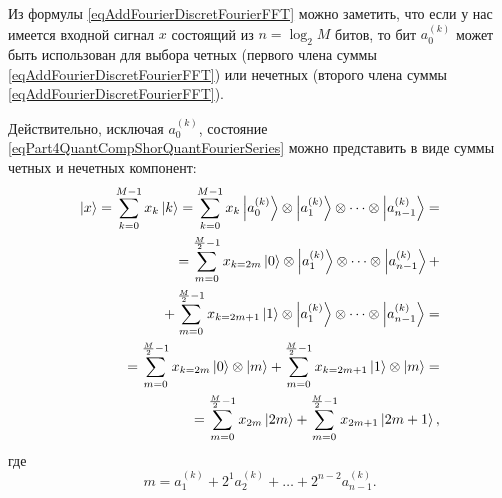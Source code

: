 Из формулы \eqref{eqAddFourierDiscretFourierFFT} можно
заметить, что если у нас имеется входной сигнал $x$ состоящий из $n =
\log_2{M}$ 
битов, то бит $a^{(k)}_0$ может быть использован для выбора четных
(первого члена суммы \eqref{eqAddFourierDiscretFourierFFT})
или нечетных 
(второго члена суммы \eqref{eqAddFourierDiscretFourierFFT}).

Действительно, исключая $a^{(k)}_0$, состояние
\eqref{eqPart4QuantCompShorQuantFourierSeries} можно представить в
виде суммы четных и нечетных компонент: 
\begin{eqnarray}
\ket{x} = \sum_{k = 0}^{M - 1}x_k \ket{k} = 
\sum_{k = 0}^{M - 1}x_k \ket{a^{(k)}_0} \otimes  \ket{a^{(k)}_1}
\otimes \cdots \otimes \ket{a^{(k)}_{n-1}} = 
\nonumber \\
 = \sum_{m = 0}^{\frac{M}{2} - 1}x_{k=2m} \ket{0} \otimes  \ket{a^{(k)}_1}
\otimes \cdots \otimes \ket{a^{(k)}_{n-1}} +
\nonumber \\
+
\sum_{m = 0}^{\frac{M}{2} - 1}x_{k=2m + 1} \ket{1} \otimes  \ket{a^{(k)}_1}
\otimes \cdots \otimes \ket{a^{(k)}_{n-1}} = 
\nonumber \\
 = \sum_{m = 0}^{\frac{M}{2} - 1}x_{k=2m} \ket{0} \otimes  \ket{m} +
\sum_{m = 0}^{\frac{M}{2} - 1}x_{k=2m + 1} \ket{1} \otimes  \ket{m} = 
\nonumber \\
= \sum_{m = 0}^{\frac{M}{2} - 1}x_{2m} \ket{2m} +
\sum_{m = 0}^{\frac{M}{2} - 1}x_{2m + 1} \ket{2m+1},
\nonumber
\end{eqnarray}
где
\begin{equation}
m = a^{(k)}_1 + 2^1 a^{(k)}_2 + \dots + 2^{n-2} a^{(k)}_{n-1}.
\nonumber
\end{equation}



